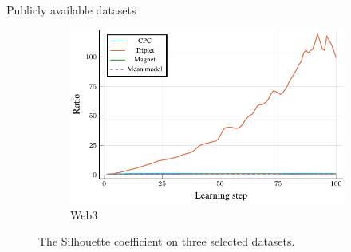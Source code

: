 \documentclass[10pt]{beamer}
\begin{document}
\begin{frame}{Publicly available datasets}
\begin{figure}
\begin{subfigure}[t]{0.38\textwidth}
    \centering
    \includegraphics[width=\textwidth]{images/Web3_ratio/Web3_ratio.pdf}
    \caption{Web3}
  \end{subfigure}
  \caption{The Silhouette coefficient on three selected datasets.}
\end{figure}
\end{frame}
\end{document}
